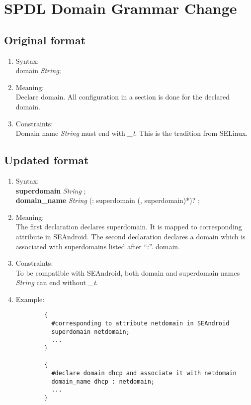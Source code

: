 \documentclass{article}
\begin{document}
\section{SPDL Domain Grammar Change}
\subsection{Original format}
\begin{enumerate}
	\item Syntax:\\
	domain {\em String};
	\item Meaning:\\
	Declare domain. All configuration in a section is done for the declared 
	domain.
	\item Constraints:\\
	Domain name {\em String} must end with {\em \_t}. This is the tradition 
	from SELinux.
\end{enumerate}

\subsection{Updated format}
\begin{enumerate}
	\item Syntax:\\
	{\bf superdomain} {\em String} ;\\
	{\bf domain\_name} {\em String} (: superdomain (, superdomain)*)? ;\\
	\item Meaning:\\
	The first declaration declares superdomain. It is mapped to corresponding 
	attribute in SEAndroid. The second declaration declares a domain which is 
	associated with superdomains listed after ``:''. 
	domain. 
	\item Constraints:\\
	To be compatible with SEAndroid, both domain and superdomain names 
	{\em String} can end without {\em \_t}.
	\item Example:\\
	\begin{verbatim}
		{
		  #corresponding to attribute netdomain in SEAndroid
		  superdomain netdomain;
		  ...
		}
		
		{
		  #declare domain dhcp and associate it with netdomain
		  domain_name dhcp : netdomain;
		  ...
		}
	\end{verbatim}
\end{enumerate}
\end{document}

